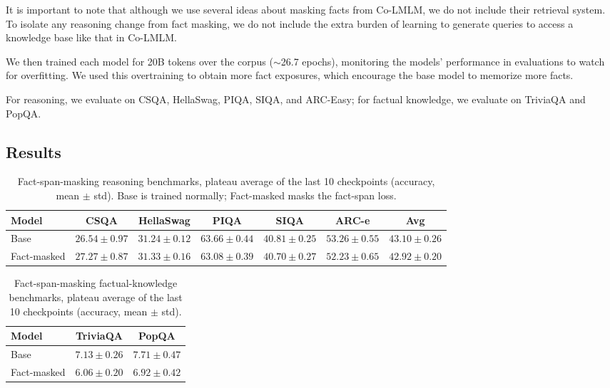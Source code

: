 \documentclass{article}
\begin{document}
It is important to note that although we use several ideas about masking facts from Co-LMLM, we do not include their retrieval system. To isolate any reasoning change from fact masking, we do not include the extra burden of learning to generate queries to access a knowledge base like that in Co-LMLM.

We then trained each model for 20B tokens over the corpus ($\sim$26.7 epochs), monitoring the models' performance in evaluations to watch for overfitting. We used this overtraining to obtain more fact exposures, which encourage the base model to memorize more facts.

For reasoning, we evaluate on CSQA, HellaSwag, PIQA, SIQA, and ARC-Easy; for factual knowledge, we evaluate on TriviaQA and PopQA.

\subsection{Results}

\begin{table}[!htbp]
\centering
\small
\caption{Fact-span-masking reasoning benchmarks, plateau average of the last 10 checkpoints (accuracy, mean $\pm$ std). Base is trained normally; Fact-masked masks the fact-span loss.}
\label{tab:colmlm-reasoning}
\begin{tabular}{lcccccc}
\toprule
Model & CSQA & HellaSwag & PIQA & SIQA & ARC-e & Avg \\
\midrule
Base  & $26.54 \pm 0.97$ & $31.24 \pm 0.12$ & $63.66 \pm 0.44$ & $40.81 \pm 0.25$ & $53.26 \pm 0.55$ & $43.10 \pm 0.26$ \\
Fact-masked & $27.27 \pm 0.87$ & $31.33 \pm 0.16$ & $63.08 \pm 0.39$ & $40.70 \pm 0.27$ & $52.23 \pm 0.65$ & $42.92 \pm 0.20$ \\
\bottomrule
\end{tabular}
\end{table}

\begin{table}[!htbp]
\centering
\small
\caption{Fact-span-masking factual-knowledge benchmarks, plateau average of the last 10 checkpoints (accuracy, mean $\pm$ std).}
\label{tab:colmlm-factual}
\begin{tabular}{lcc}
\toprule
Model & TriviaQA & PopQA \\
\midrule
Base  & $7.13 \pm 0.26$ & $7.71 \pm 0.47$ \\
Fact-masked & $6.06 \pm 0.20$ & $6.92 \pm 0.42$ \\
\bottomrule
\end{tabular}
\end{table}
\end{document}
